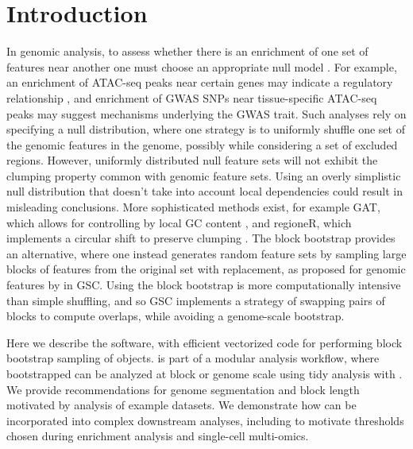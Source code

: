 \section{Introduction}

In genomic analysis, to assess whether
there is an enrichment of one set of features near another 
one must choose an appropriate null model \citep{reviewdilemma2014}.
For example, an enrichment of ATAC-seq peaks near certain genes
may indicate a regulatory relationship \citep{lee2020fluent}, 
and enrichment of GWAS SNPs near tissue-specific ATAC-seq peaks may
suggest mechanisms underlying the GWAS trait.
Such analyses rely on specifying a null distribution, where one
strategy is to uniformly shuffle one set of the
genomic features in the genome, possibly while considering a set of
excluded regions.
However, uniformly distributed null feature sets will not exhibit the
clumping property common with genomic feature sets.
Using an overly simplistic null distribution that doesn't take into
account local dependencies could result in misleading conclusions.
More sophisticated methods exist, for example
GAT, which allows for controlling by local GC content
\citep{GAT_2013}, and regioneR, which implements a circular shift to
preserve clumping \citep{gel2016regioner}.
The block bootstrap \citep{politis1999subsampling}
provides an alternative, where one instead generates
random feature sets by sampling large blocks of features from the
original set with replacement, as proposed for 
genomic features by \citet{bickel2010subsampling} in GSC.
Using the block bootstrap is more
computationally intensive than simple shuffling, and so GSC implements
a strategy of swapping pairs of blocks to compute overlaps, while
avoiding a genome-scale bootstrap.

Here we describe the \bootranges software, with efficient
vectorized code for performing block bootstrap sampling of
\granges \citep{lawrence2013software} objects.
\bootranges is part of a modular analysis workflow, where bootstrapped
\granges can be analyzed at block or genome scale using tidy
analysis with \plyranges \citep{lee2019plyranges}.
We provide recommendations for genome segmentation and block length
motivated by analysis of example datasets.
We demonstrate how \bootranges can be incorporated into complex
downstream analyses, including to motivate thresholds chosen during
enrichment analysis and single-cell multi-omics.

\vspace*{-20pt}


